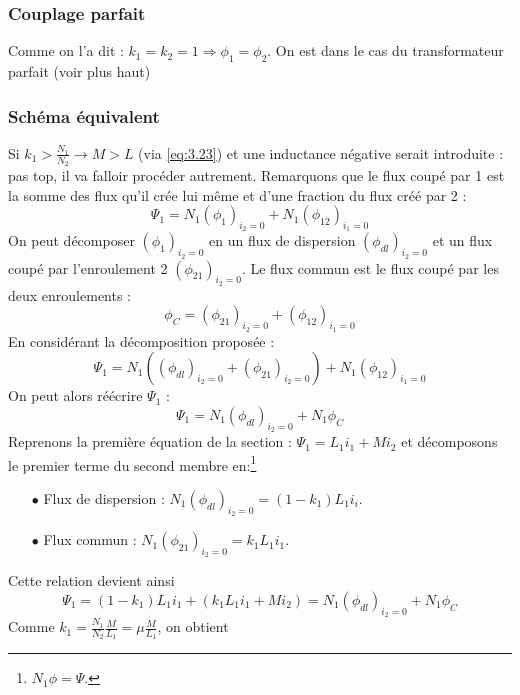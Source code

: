 		\subsubsection{Couplage parfait}
		Comme on l'a dit : $k_1=k_2=1 \Rightarrow \phi_1=\phi_2$. On est dans le cas du 
		transformateur parfait (voir plus haut)
		
		\subsubsection{Schéma équivalent}
		Si $k_1>\frac{N_1}{N_2} \rightarrow M>L$ (via \autoref{eq:3.23}) et une 
		inductance négative serait 
		introduite : pas top, il va falloir procéder autrement. Remarquons que le 
		flux coupé par 1 est la somme des flux qu'il crée lui même et d'une fraction 
		du flux créé par 2 :
		\begin{equation}
		\Psi_1 = N_1(\phi_1)_{i_2=0} + N_1(\phi_{12})_{i_1=0}
		\end{equation}
		On peut décomposer $(\phi_1)_{i_2=0}$ en un flux de dispersion $(\phi_{dl})_{i_2=0}$ 
		et un flux 	coupé par l'enroulement 2 $(\phi_{21})_{i_2=0}$. Le flux commun est 
		le flux coupé par les deux 	enroulements :
		\begin{equation}
		\phi_C = (\phi_{21})_{i_2=0} + (\phi_{12})_{i_1=0}
		\end{equation}
		En considérant la décomposition proposée :
		\begin{equation}
		\Psi_1 = N_1((\phi_{dl})_{i_2=0}+(\phi_{21})_{i_2=0})+N_1(\phi_{12})_{i_1=0}
		\end{equation}
		On peut alors réécrire $\Psi_1$ :
		\begin{equation}
		\Psi_1 = N_1(\phi_{dl})_{i_2=0} + N_1\phi_C
		\end{equation}
		Reprenons la première équation de la section : $\Psi_1 = L_1i_1 + Mi_2$ et 
		décomposons le premier terme du second membre en:\footnote{$N_1\phi = \Psi$.}
		\begin{itemize}
		\item[$\bullet$] Flux de dispersion : $N_1(\phi_{dl})_{i_2=0} = (1-k_1)L_1i_i$.
		\item[$\bullet$] Flux commun : $N_1(\phi_{21})_{i_2=0} = k_1L_1i_1$.
		\end{itemize}
		Cette relation devient ainsi 
		\begin{equation}
		\Psi_1 = (1-k_1)L_1i_1 + (k_1L_1i_1 + Mi_2) = N_1(\phi_{dl})_{i_2=0} + N_1\phi_C
		\end{equation}
		Comme $k_1 = \frac{N_1}{N_2}\frac{M}{L_1} = \mu\frac{M}{L_1}$, on obtient
